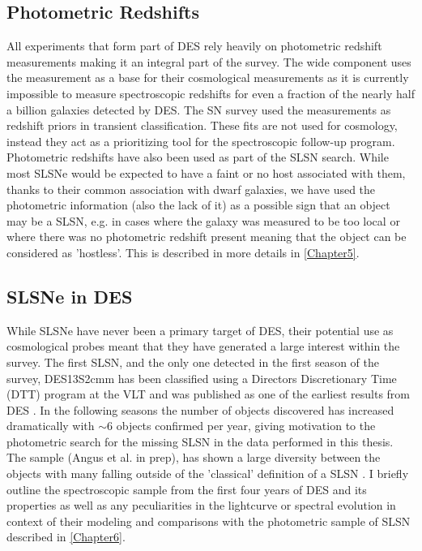\subsection{Photometric Redshifts}
All experiments that form part of DES rely heavily on photometric redshift measurements making it an integral part of the survey. The wide component uses the measurement as a base for their cosmological measurements as it is currently impossible to measure spectroscopic redshifts for even a fraction of the nearly half a billion galaxies detected by DES. The SN survey used the measurements as redshift priors in transient classification. These fits are not used for cosmology, instead they act as a prioritizing tool for the spectroscopic follow-up program. Photometric redshifts have also been used as part of the SLSN search. While most SLSNe would be expected to have a faint or no host associated with them, thanks to their common association with dwarf galaxies, we have used the photometric information (also the lack of it) as a possible sign that an object may be a SLSN, e.g. in cases where the galaxy was measured to be too local or where there was no photometric redshift present meaning that the object can be considered as 'hostless'. This is described in more details in \cref{Chapter5}. 

\subsection{SLSNe in DES}
\label{sec:DES_SLSN}
While SLSNe have never been a primary target of DES, their potential use as cosmological probes \citep{Inserra2014} meant that they have generated a large interest within the survey. The first SLSN, and the only one detected in the first season of the survey, DES13S2cmm has been classified using a Directors Discretionary Time (DTT) program at the VLT and was published as one of the earliest results from DES \cite{Papadopoulos2015}. In the following seasons the number of objects discovered has increased dramatically with $\sim$6 objects confirmed per year, giving motivation to the photometric search for the missing SLSN in the data performed in this thesis. The sample (Angus et al. in prep), has shown a large diversity between the objects with many falling outside of the 'classical' definition of a SLSN \citep{Inserra2018}. I briefly outline the spectroscopic sample from the first four years of DES and its properties as well as any peculiarities in the lightcurve or spectral evolution in context of their modeling and comparisons with the photometric sample of SLSN described in \cref{Chapter6}.   

